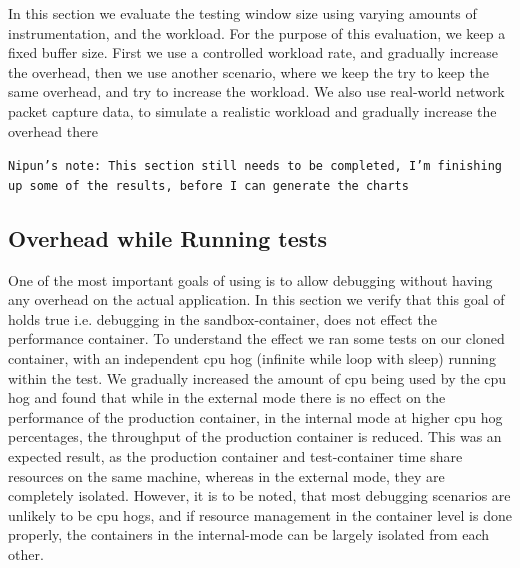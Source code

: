 In this section we evaluate the testing window size using varying amounts of instrumentation, and the workload.
For the purpose of this evaluation, we keep a fixed buffer size. 
First we use a controlled workload rate, and gradually increase the overhead, then we use another scenario, where we keep the try to keep the same overhead, and try to increase the workload.
We also use real-world network packet capture data, to simulate a realistic workload and gradually increase the overhead there

\texttt{Nipun's note: This section still needs to be completed, I'm finishing up some of the results, before I can generate the charts}

\subsection{Overhead while Running tests}
\label{sec:overhead}

One of the most important goals of using \parikshan is to allow debugging without having any overhead on the actual application.
In this section we verify that this goal of \parikshan holds true i.e. debugging in the sandbox-container, does not effect the performance container. 
To understand the effect we ran some tests on our cloned container, with an independent cpu hog (infinite while loop with sleep) running within the test.
We gradually increased the amount of cpu being used by the cpu hog and found that while in the external mode there is no effect on the performance of the production container, in the internal mode at higher cpu hog percentages, the throughput of the production container is reduced.
This was an expected result, as the production container and test-container time share resources on the same machine, whereas in the external mode, they are completely isolated.
However, it is to be noted, that most debugging scenarios are unlikely to be cpu hogs, and if resource management in the container level is done properly, the containers in the internal-mode can be largely isolated from each other.

\fi
